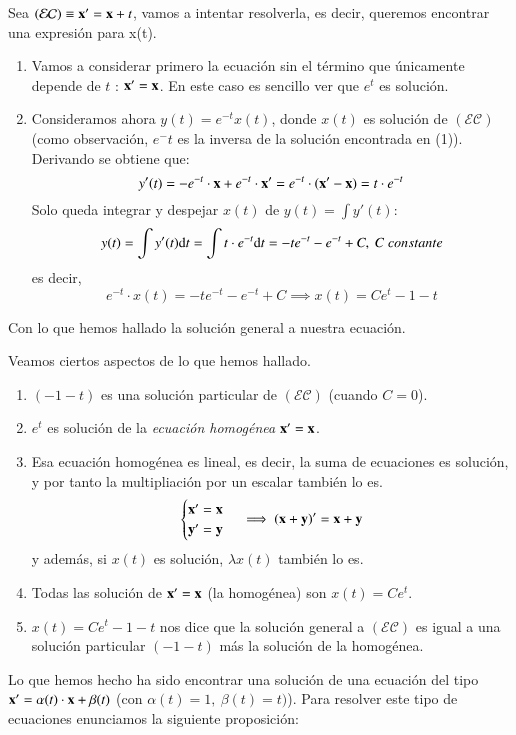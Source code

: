 \begin{eg}\label{eg:lineal-order}
    Sea $\mathcal{(EC)} \equiv \mathbf{x'} = \mathbf{x} + t$, vamos a intentar resolverla, es decir, queremos encontrar una expresión para x(t).\\
    \begin{enumerate}
        \item Vamos a considerar primero la ecuación sin el término que únicamente depende de $t$ : $\mathbf{x}' = \mathbf{x}$. En este caso es sencillo ver que $e^t$ es solución.

        \item Consideramos ahora $y(t) = e^{-t}x(t)$, donde $x(t)$ es solución de $\mathcal{(EC)}$ (como observación, $e^-t$ es la inversa de la solución encontrada en (1)). Derivando se obtiene que:
        $$
            y'(t) = -e^{-t}\cdot \mathbf{x} + e^{-t} \cdot \mathbf{x'} = e^{-t} \cdot (\mathbf{x'}  - \mathbf{x}) = t \cdot e^{-t}
        $$
        Solo queda integrar y despejar $x(t)$ de $y(t) = \int y'(t)$:
        $$
            y(t) = \int y'(t) \mathrm{d} t = \int t \cdot e^{-t} \mathrm{d} t = -te^{-t} - e^{-t} + C,\ C\ constante
        $$
        es decir,
        $$
            e^{-t} \cdot x(t) = -te^{-t} - e^{-t} + C \implies x(t) = Ce^t - 1 - t
        $$
    \end{enumerate}
    Con lo que hemos hallado la solución general a nuestra ecuación.
\end{eg}
\begin{obs}
    Veamos ciertos aspectos de lo que hemos hallado.\\
    \begin{enumerate}
        \item $(-1-t)$ es una solución particular de $\mathcal{(EC)}$ (cuando $C=0$).
        \item $e^t$ es solución de la \textit{ecuación homogénea} $\mathbf{x'} = \mathbf{x}$.
        \item Esa ecuación homogénea es lineal, es decir, la suma de ecuaciones es solución, y por tanto la multipliación por un escalar también lo es.
        $$
        \begin{cases}
            \mathbf{x'} = \mathbf{x}\\ \mathbf{y'} = \mathbf{y}
        \end{cases}
        \implies (\mathbf{x}+\mathbf{y})' = \mathbf{x} + \mathbf{y}
        $$
        y además, si $x(t)$ es solución, $\lambda x(t)$ también lo es.
        \item Todas las solución de $\mathbf{x'} = \mathbf{x}$ (la homogénea) son $x(t) = Ce^t$.
        \item $x(t) = Ce^t - 1 - t$ nos dice que la solución general a $\mathcal{(EC)}$ es igual a una solución particular $(-1-t)$ más la solución de la homogénea.
    \end{enumerate}
\end{obs}
Lo que hemos hecho ha sido encontrar una solución de una ecuación del tipo $\mathbf{x'} = \alpha(t)\cdot\mathbf{x}+\beta(t)$ (con $\alpha(t) = 1,\ \beta(t) = t)$). Para resolver este tipo de ecuaciones enunciamos la siguiente proposición:

